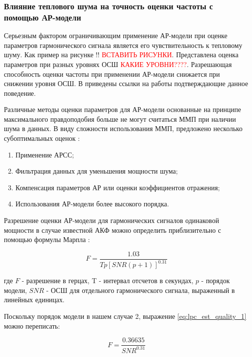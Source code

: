 \subsubsection{Влияние теплового шума на точность оценки частоты с помощью АР-модели}
Серьезным фактором ограничивающим применение АР-модели при оценке параметров гармонического сигнала является
его чувствительность к тепловому шуму. Как пример на рисунке !! \textcolor{red}{ВСТАВИТЬ РИСУНКИ}. Представлена
оценка параметров при разных уровнях ОСШ \textcolor{red}{КАКИЕ УРОВНИ????}. Разрешающая способность оценки
частоты при применении АР-модели снижается при снижении уровня ОСШ.
В \cite{kay_ar_book} приведены ссылки на работы
\cite{lacoss_spectral_est, chen_spectral_est, marple_1977} подтверждающие данное поведение.

Различные методы оценки параметров для АР-модели основанные на принципе максимального правдоподобия больше не
могут считаться ММП при наличии шума в данных. В виду сложности использования ММП, предложено несколько 
субоптимальных оценок \cite{marpl_book, kay_ar_book}:
\begin{enumerate}
	\item Применение АРСС;
	\item Фильтрация данных для уменьшения мощности шума;
	\item Компенсация параметров АР или оценки коэффициентов отражения;
	\item Использования АР-модели более высокого порядка.
\end{enumerate}

Разрешение оценки АР-модели для гармонических сигналов одинаковой мощности в случае известной АКФ
можно определить приблизительно с помощью формулы Марпла \cite{marpl_book, kay_ar_book}:
\begin{center}
\begin{equation}
	\label{eq:lpc_est_quality_1}
	F = \frac{1.03}{Tp[SNR(p+1)]^{0.31}}
\end{equation}
\end{center}

где ${F}$ - разрешение в герцах, T - интервал отсчетов в секундах, ${p}$ - порядок модели,
${SNR}$ - ОСШ для отдельного гармонического сигнала, выраженный в линейных единицах.

Поскольку порядок модели в нашем случае 2, выражение \ref{eq:lpc_est_quality_1} можно переписать:
\begin{center}
\begin{equation}
	\label{eq:lpc_est_quality_2}
	F = \frac{0.36635}{SNR^{0.31}}
\end{equation}
\end{center}

